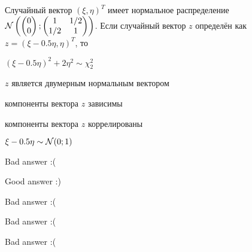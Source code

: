 
\begin{question}
Случайный вектор \((\xi, \eta)^T\) имеет нормальное распределение
\(\mathcal{N} \left( \begin{pmatrix} 0 \\ 0 \end{pmatrix}; \begin{pmatrix} 1 & 1/2 \\ 1/2 & 1 \end{pmatrix} \right)\).
Если случайный вектор \(z\) определён как \(z=(\xi - 0.5\eta, \eta)^T\),
то
\begin{answerlist}
  \item \((\xi - 0.5\eta)^2 + 2\eta^2 \sim \chi_2^2\)
  \item \(z\) является двумерным нормальным вектором
  \item компоненты вектора \(z\) зависимы
  \item компоненты вектора \(z\) коррелированы
  \item \(\xi - 0.5\eta \sim \mathcal{N}(0;1)\)
\end{answerlist}
\end{question}

\begin{solution}
\begin{answerlist}
  \item Bad answer :(
  \item Good answer :)
  \item Bad answer :(
  \item Bad answer :(
  \item Bad answer :(
\end{answerlist}
\end{solution}

